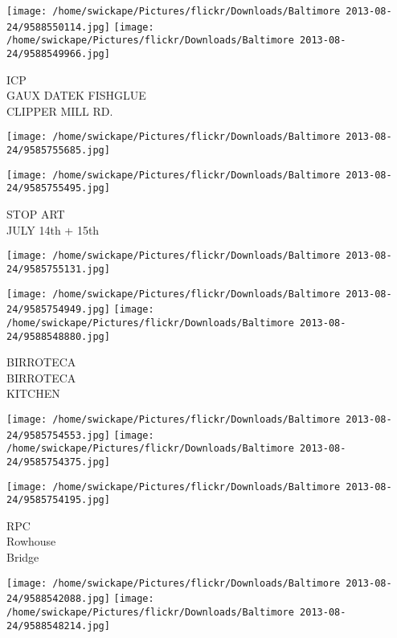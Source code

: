 \documentclass[10pt,letterpaper]{article}
\begin{document}
\vspace{0.25in}
\texttt{[image: /home/swickape/Pictures/flickr/Downloads/Baltimore 2013-08-24/9588550114.jpg]}
\texttt{[image: /home/swickape/Pictures/flickr/Downloads/Baltimore 2013-08-24/9588549966.jpg]}

ICP\\
GAUX DATEK FISHGLUE\\
CLIPPER MILL RD.\\
\pagebreak

\texttt{[image: /home/swickape/Pictures/flickr/Downloads/Baltimore 2013-08-24/9585755685.jpg]}

\vspace{0.25in}
\texttt{[image: /home/swickape/Pictures/flickr/Downloads/Baltimore 2013-08-24/9585755495.jpg]}

STOP ART\\
JULY 14th + 15th\\
\pagebreak

\texttt{[image: /home/swickape/Pictures/flickr/Downloads/Baltimore 2013-08-24/9585755131.jpg]}

\vspace{0.25in}
\texttt{[image: /home/swickape/Pictures/flickr/Downloads/Baltimore 2013-08-24/9585754949.jpg]}
\texttt{[image: /home/swickape/Pictures/flickr/Downloads/Baltimore 2013-08-24/9588548880.jpg]}

BIRROTECA\\
BIRROTECA\\
KITCHEN\\
\pagebreak

\texttt{[image: /home/swickape/Pictures/flickr/Downloads/Baltimore 2013-08-24/9585754553.jpg]}
\texttt{[image: /home/swickape/Pictures/flickr/Downloads/Baltimore 2013-08-24/9585754375.jpg]}

\vspace{0.25in}
\texttt{[image: /home/swickape/Pictures/flickr/Downloads/Baltimore 2013-08-24/9585754195.jpg]}

RPC\\
Rowhouse\\
Bridge\\
\pagebreak

\texttt{[image: /home/swickape/Pictures/flickr/Downloads/Baltimore 2013-08-24/9588542088.jpg]}
\texttt{[image: /home/swickape/Pictures/flickr/Downloads/Baltimore 2013-08-24/9588548214.jpg]}
\end{document}
